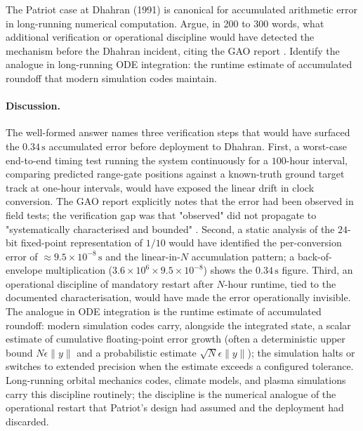 \begin{exercise}
The Patriot case at Dhahran (1991) is canonical for accumulated
arithmetic error in long-running numerical computation. Argue, in
200 to 300 words, what additional verification or operational
discipline would have detected the mechanism before the Dhahran
incident, citing the GAO report \cite{acc:gao-patriot-1992}.
Identify the analogue in long-running ODE integration: the
runtime estimate of accumulated roundoff that modern simulation
codes maintain.

\paragraph{Discussion.} The well-formed answer names three
verification steps that would have surfaced the
$0.34\,\si{\second}$ accumulated error before deployment to
Dhahran. First, a worst-case end-to-end timing test running the
system continuously for a $100$-hour interval, comparing
predicted range-gate positions against a known-truth ground
target track at one-hour intervals, would have exposed the
linear drift in clock conversion. The GAO report explicitly
notes that the error had been observed in field tests; the
verification gap was that "observed" did not propagate to
"systematically characterised and bounded"
\cite{acc:gao-patriot-1992}. Second, a static analysis of the
$24$-bit fixed-point representation of $1/10$ would have
identified the per-conversion error of $\approx 9.5 \times 10^{
-8}\,\si{\second}$ and the linear-in-$N$ accumulation pattern;
a back-of-envelope multiplication ($3.6 \times 10^{6} \times
9.5 \times 10^{-8}$) shows the $0.34\,\si{\second}$ figure.
Third, an operational discipline of mandatory restart after
$N$-hour runtime, tied to the documented characterisation,
would have made the error operationally invisible. The
analogue in ODE integration is the runtime estimate of
accumulated roundoff: modern simulation codes carry, alongside
the integrated state, a scalar estimate of cumulative
floating-point error growth (often a deterministic upper bound
$N \epsilon \|y\|$ and a probabilistic estimate $\sqrt{N}
\epsilon \|y\|$); the simulation halts or switches to extended
precision when the estimate exceeds a configured tolerance.
Long-running orbital mechanics codes, climate models, and
plasma simulations carry this discipline routinely; the
discipline is the numerical analogue of the operational
restart that Patriot's design had assumed and the deployment
had discarded.
\end{exercise}

